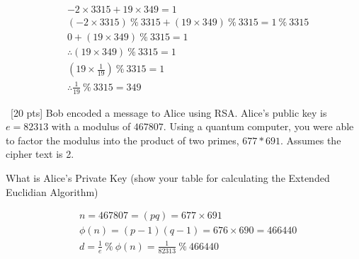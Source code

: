 \documentclass[12pt]{article}
\newenvironment{sol}[1][Solution]{\begin{trivlist}\item[\hskip\labelsep {\bfseries #1:}]}{\end{trivlist}}
\begin{document}
\begin{enumerate}
\begin{sol}
\begin{center}
\begin{tabular}{|c|c|c|c|c|c|c|}
        \end{tabular}
    \end{center}
    \begin{align*}
        &-2 \times 3315 + 19 \times 349 = 1\\
        &(-2 \times 3315) \ \% \ 3315 + (19 \times 349)\ \% \ 3315 = 1 \ \% \ 3315\\
        & 0 + (19 \times 349) \ \% \ 3315 = 1\\
        & \therefore (19 \times 349) \ \% \ 3315 = 1\\
        & (19 \times \frac{1}{19}) \ \% \ 3315 = 1\\
        & \therefore \frac{1}{19} \ \% \ 3315 = 349
    \end{align*}
    \end{sol}

    \item \ [20 pts] Bob encoded a message to Alice using RSA. Alice’s public key is $e = 82313$ with a modulus of $467807$. Using a quantum computer, you were able to factor the modulus into the product of two primes, $677 * 691$. Assumes the cipher text is 2.
    \begin{enumerate}
        \item [a.] What is Alice’s Private Key (show your table for calculating the Extended Euclidian Algorithm)
        \begin{sol}
            \begin{align*}
                &n = 467807 = (pq) = 677 \times 691 \\
                &\phi(n) = (p-1)(q-1) = 676 \times 690 = 466440\\
                &d = \frac{1}{e} \ \% \ \phi(n) =\frac{1}{82313} \ \% \ 466440 \\
            \end{align*}
            \begin{center}


\end{center}
\end{sol}
\end{enumerate}
\end{enumerate}
\end{document}

